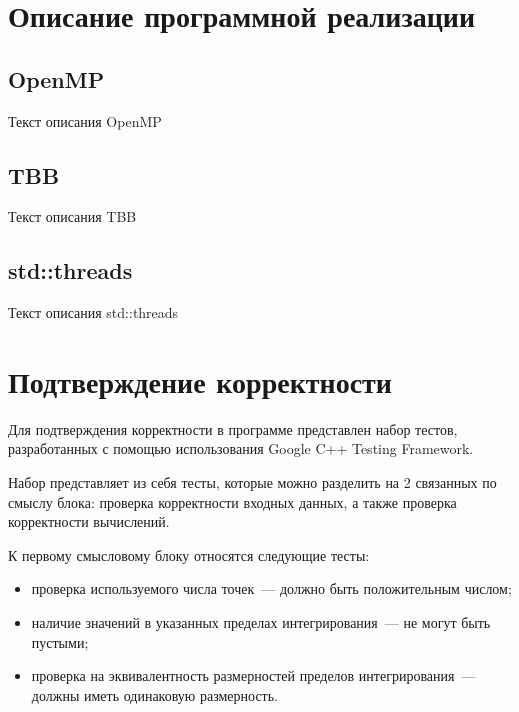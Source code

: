 \documentclass{report}
\begin{document}
\section*{Описание программной реализации}

\subsection*{OpenMP}
Текст описания OpenMP

\subsection*{TBB}
Текст описания TBB

\subsection*{std::threads}
Текст описания std::threads

\newpage

\section*{Подтверждение корректности}
\indent\par Для подтверждения корректности в программе представлен набор тестов, разработанных с помощью использования Google C++ Testing Framework.
\par Набор представляет из себя тесты, которые можно разделить на 2 связанных по смыслу блока: проверка корректности входных данных, а также проверка корректности вычислений.

\par К первому смысловому блоку относятся следующие тесты: 
\begin{itemize}
\item проверка используемого числа точек~--- должно быть положительным числом;
\item наличие значений в указанных пределах интегрирования~--- не могут быть пустыми;
\item проверка на эквивалентность размерностей пределов интегрирования~--- должны иметь одинаковую размерность.
\end{itemize}
 
\end{document}
